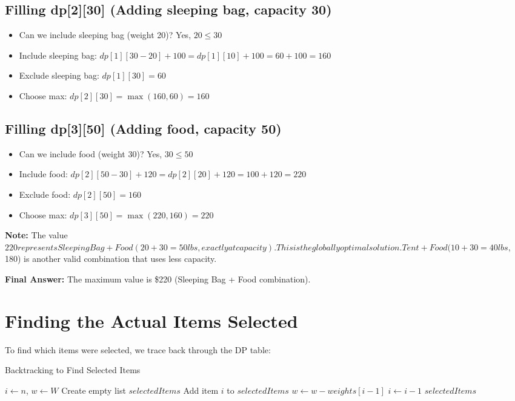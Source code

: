 \documentclass[12pt,a4paper]{article}
\begin{document}
\subsection{Filling dp[2][30] (Adding sleeping bag, capacity 30)}
\begin{itemize}
\item Can we include sleeping bag (weight 20)? Yes, $20 \leq 30$
\item Include sleeping bag: $dp[1][30-20] + 100 = dp[1][10] + 100 = 60 + 100 = 160$
\item Exclude sleeping bag: $dp[1][30] = 60$
\item Choose max: $dp[2][30] = \max(160, 60) = 160$
\end{itemize}

\subsection{Filling dp[3][50] (Adding food, capacity 50)}
\begin{itemize}
\item Can we include food (weight 30)? Yes, $30 \leq 50$
\item Include food: $dp[2][50-30] + 120 = dp[2][20] + 120 = 100 + 120 = 220$
\item Exclude food: $dp[2][50] = 160$
\item Choose max: $dp[3][50] = \max(220, 160) = 220$
\end{itemize}

\textbf{Note:} The value $220 represents Sleeping Bag + Food (20+30=50 lbs, exactly at capacity).
This is the globally optimal solution. Tent + Food (10+30=40 lbs, $180) is another valid combination that uses less capacity.

\textbf{Final Answer:} The maximum value is \$220 (Sleeping Bag + Food combination).

\section{Finding the Actual Items Selected}

To find which items were selected, we trace back through the DP table:

\begin{algorithm}
\caption{Backtracking to Find Selected Items}
\begin{algorithmic}
\STATE $i \leftarrow n$, $w \leftarrow W$
\STATE Create empty list $selectedItems$
        \STATE Add item $i$ to $selectedItems$
        \STATE $w \leftarrow w - weights[i-1]$
    \ENDIF
    \STATE $i \leftarrow i - 1$
\ENDWHILE
\RETURN $selectedItems$
\end{algorithmic}
\end{algorithm}
\end{document}
